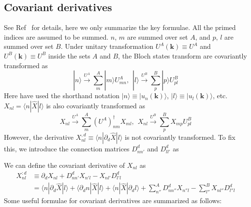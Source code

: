 \documentclass[prx,amsmath,amssymb,superscriptaddress,longbibliography]{revtex4-2}
\begin{document}
\subsection{Covariant derivatives}

See Ref~\cite{Liu2023CovariantderivativesBerry} for details, here we only summarize the key formulae. All the primed indices are assumed to be summed. $n$, $m$ are summed over set $A$, and $p$, $l$ are summed over set $B$. Under unitary transformation $U^A(\bm{k})\equiv U^A$ and $U^B(\bm{k})\equiv U^B$ inside the sets $A$ and $B$, the Bloch states transform are covariantly transformed as
\begin{equation}
    |n\rangle\stackrel{U^{A}}{\longrightarrow}\sum_{m}^{A}|m\rangle U_{mn}^{A}, \hspace{5pt} |l\rangle\stackrel{U^{B}}{\longrightarrow}\sum_{p}^{B}|p\rangle U_{pl}^{B}
\end{equation}
Here have used the shorthand notation $|n\rangle\equiv|u_n(\bm{k})\rangle$, $|l\rangle\equiv|u_l(\bm{k})\rangle$, etc. $X_{nl}=\langle n|\hat{X}|l\rangle$ is also covariantly transformed as
\begin{equation}
    X_{nl}\stackrel{U^{A}}{\longrightarrow}\sum_{m}^{A}\left(U^{A}\right)_{nm}^{\dagger}X_{ml},\hspace{5pt} X_{nl}\stackrel{U^{B}}{\longrightarrow}\sum_{p}^{B}X_{mp}U_{pl}^{B}
\end{equation}
However, the derivative $X_{nl}^{,d}\equiv\langle n|\partial_{d}\hat{X}|l\rangle$ is not covariantly transformed. To fix this, we introduce the connection matrices $D_{nn'}^{d}$ and $D_{ll'}^{d}$ as

We can define the covariant derivative of $X_{nl}$ as
\begin{align}
    X_{nl}^{:d} &\equiv \partial_{d}X_{nl}+D_{nn'}^{d}X_{n'l}-X_{nl'}D_{l'l}^{d} \\
     &= \langle n| \partial_d \hat{X} |l\rangle + \langle \partial_d n | \hat{X} | l \rangle + \langle n | \hat{X} | \partial_d l \rangle + \sum_{n''}^{A} D_{nn''}^d X_{n''l} - \sum_{l''}^{B} X_{nl''} D_{l''l}^d
\end{align}
Some useful formulae for covariant derivatives are summarized as follows:
\end{document}
